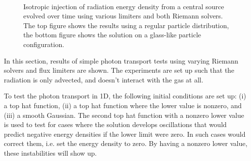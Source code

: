 \begin{figure}
 \centering
 \\
 \caption{
Isotropic injection of radiation energy density from a central source evolved over time using
various limiters and both Riemann solvers. The top figure shows the results using a regular
particle distribution, the bottom figure shows the solution on a glass-like particle configuration.
 }
 \label{fig:rt-riemann-limiter-2D-injection}
\end{figure}









In this section, results of simple photon transport tests using varying Riemann solvers and flux
limiters are shown. The experiments are set up such that the radiation is only advected, and
doesn't interact with the gas at all.

To test the photon transport in 1D, the following initial conditions are set up: (i) a top hat
function, (ii) a top hat function where the lower value is nonzero, and (iii) a smooth Gaussian. The
second top hat function with a nonzero lower value is used to test for cases where the solution
develops oscillations that would predict negative energy densities if the lower limit were zero. In
such cases \GEARRT would correct them, i.e. set the energy density to zero. By having a nonzero
lower value, these instabilities will show up.

